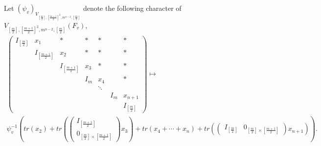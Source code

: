 \documentclass[12pts]{amsart}
\begin{document}
Let $(\psi_v)_{V_{[\frac{m}{2}],[\frac{m+1}{2}]^2,m^{n-2},[\frac{m}{2}]}}$ denote the following character of\\
 $V_{[\frac{m}{2}],[\frac{m+1}{2}]^2,m^{n-2},[\frac{m}{2}]}(F_v)$,
\begin{multline}\label{12.58}
\begin{pmatrix}I_{[\frac{m}{2}]}&x_1&\ast&\ast&\ast&&\ast\\
&I_{[\frac{m+1}{2}]}&x_2&\ast&\ast&&\ast\\&&I_{[\frac{m+1}{2}]}&x_3&\ast&&\ast\\&&&I_m&x_4&&\ast
\\&&&&\ddots\\&&&&&I_m&x_{n+1}\\&&&&&&I_{[\frac{m}{2}]}\end{pmatrix}\mapsto\\ \psi^{-1}_v(tr(x_2)+tr(\begin{pmatrix}I_{[\frac{m+1}{2}]}\\0_{[\frac{m}{2}]\times [\frac{m+1}{2}]}\end{pmatrix}x_3)+tr(x_4+\cdots+x_n)+tr(\begin{pmatrix}I_{[\frac{m}{2}]}&0_{[\frac{m}{2}]\times [\frac{m+1}{2}]}\end{pmatrix}x_{n+1})).
\end{multline}
\end{document}
